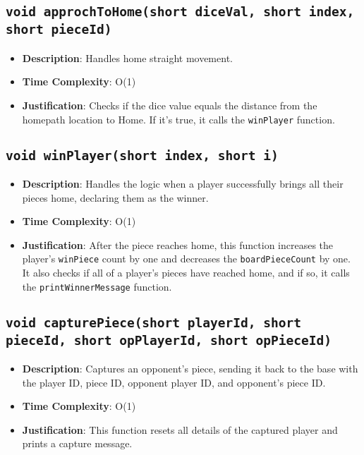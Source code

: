 \documentclass{article}
\begin{document}
\subsection{\texttt{void approchToHome(short diceVal, short index, short pieceId)}}
\begin{itemize}
    \item \textbf{Description}: Handles home straight movement.
    \item \textbf{Time Complexity}: O(1)
    \item \textbf{Justification}: Checks if the dice value equals the distance from the homepath location to Home. If it’s true, it calls the \texttt{winPlayer} function.
\end{itemize}

\subsection{\texttt{void winPlayer(short index, short i)}}
\begin{itemize}
    \item \textbf{Description}: Handles the logic when a player successfully brings all their pieces home, declaring them as the winner.
    \item \textbf{Time Complexity}: O(1)
    \item \textbf{Justification}: After the piece reaches home, this function increases the player's \texttt{winPiece} count by one and decreases the \texttt{boardPieceCount} by one. It also checks if all of a player's pieces have reached home, and if so, it calls the \texttt{printWinnerMessage} function.
\end{itemize}

\subsection{\texttt{void capturePiece(short playerId, short pieceId, short opPlayerId, short opPieceId)}}
\begin{itemize}
    \item \textbf{Description}: Captures an opponent's piece, sending it back to the base with the player ID, piece ID, opponent player ID, and opponent’s piece ID.
    \item \textbf{Time Complexity}: O(1)
    \item \textbf{Justification}: This function resets all details of the captured player and prints a capture message.
\end{itemize}
\end{document}

